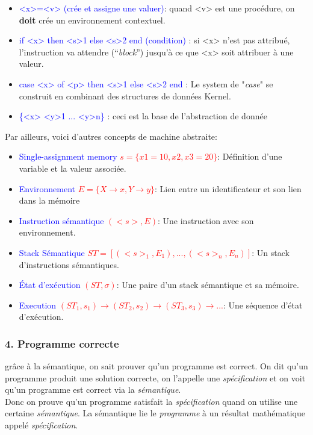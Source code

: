 \documentclass{report}
\begin{document}
\begin{itemize}
\item \textcolor{blue}{<x>=<v> (crée et assigne une valuer)}: quand <v> est une procédure, on \textbf{doit} crée un environnement contextuel.
\item \textcolor{blue}{if <x> then <s>1 else <s>2 end (condition)} : si <x> n'est pas attribué, l'instruction va attendre (“\textit{block}”) jusqu'à ce que <x> soit attribuer à une valeur.
\item \textcolor{blue}{case <x> of <p> then <s>1 else <s>2 end} : Le system de "\textit{case}" se construit en combinant des structures de données Kernel.
\item \textcolor{blue}{\{<x> <y>1 ... <y>n\}} : ceci est la base de l'abstraction de donnée
\end{itemize}
Par ailleurs, voici d'autres concepts de machine abstraite:
\begin{itemize}
\item \textcolor{blue}{Single-assignment memory }\textcolor{red}{$s = \{x1=10,x2,x3=20\}$}: Définition d'une variable et la valeur associée.
\item \textcolor{blue}{Environnement }\textcolor{red}{$E = \{X \rightarrow x, Y \rightarrow y\}$}: Lien entre un identificateur et son lien dans la mémoire
\item \textcolor{blue}{Instruction sémantique }\textcolor{red}{$(<s>, E)$}: Une instruction avec son environnement.
\item \textcolor{blue}{Stack Sémantique }\textcolor{red}{$ST = [(<s>_1,E_1), ..., (<s>_n,E_n)]$}: Un stack d'instructions sémantiques.
\item \textcolor{blue}{État d'exécution }\textcolor{red}{$(ST,\sigma)$}: Une paire d'un stack sémantique et sa mémoire.
\item \textcolor{blue}{Execution }\textcolor{red}{$(ST_1,s_1) \rightarrow (ST_2,s_2) \rightarrow (ST_3,s_3) \rightarrow ...$}: Une séquence d'état d'exécution. 
\end{itemize}

\subsubsection{4. Programme correcte}
grâce à la sémantique, on sait prouver qu'un programme est correct. On dit qu'un programme produit une solution correcte, on l'appelle une \textit{spécification} et on voit qu'un programme est correct via la \textit{sémantique}.\\
Donc on prouve qu'un programme satisfait la \textit{spécification} quand on utilise une certaine \textit{sémantique}. La sémantique lie le \textit{programme} à un résultat mathématique appelé \textit{spécification}.\\
\end{document}
